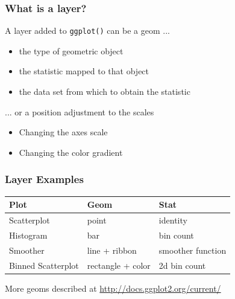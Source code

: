\documentclass{beamer}\usepackage[]{graphicx}\usepackage[]{color}
\begin{document}
\begin{frame}
\frametitle{What is a layer?}
    A layer added to \texttt{ggplot()} can be a geom ...
\begin{itemize}
  \item the type of geometric object
  \item the statistic mapped to that object
  \item the data set from which to obtain the statistic
\end{itemize}
    \vspace{.25in}
    ... or a position adjustment to the scales
\begin{itemize}
  \item Changing the axes scale
  \item Changing the color gradient
\end{itemize}
    
\end{frame}



\begin{frame}
\frametitle{Layer Examples}

\begin{table}[ht]
\centering
\begin{tabular}{|l|ll|}
  \hline
Plot & Geom & Stat \\ 
  \hline
Scatterplot  & point  &  identity \\
Histogram  & bar  & bin count \\
Smoother  & line + ribbon & smoother function \\
Binned Scatterplot  & rectangle + color & 2d bin count \\
   \hline
\end{tabular}
\end{table}
    
More geoms described at \url{http://docs.ggplot2.org/current/}
\end{frame}

\end{document}

